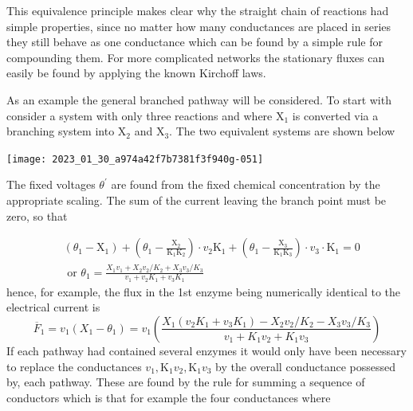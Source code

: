 This equivalence principle makes clear why the straight chain of reactions had simple properties, since no matter how many conductances are placed in series they still behave as one conductance which can be found by a simple rule for compounding them. For more complicated networks the stationary fluxes can easily be found by applying the known Kirchoff laws.

As an example the general branched pathway will be considered. To start with consider a system with only three reactions and where $\mathrm{X}_{1}$ is converted via a branching system into $\mathrm{X}_{2}$ and $\mathrm{X}_{3}$. The two equivalent systems are shown below


\begin{center}
\texttt{[image: 2023\_01\_30\_a974a42f7b7381f3f940g-051]}
\end{center}


The fixed voltages $\theta^{\prime}$ are found from the fixed chemical concentration by the appropriate scaling. The sum of the current leaving the branch point must be zero, so that

$$
\begin{aligned}
& \left(\theta_{1}-\mathrm{X}_{1}\right)+\left(\theta_{1}-\frac{\mathrm{X}_{2}}{\mathrm{K}_{1} \mathrm{K}_{2}}\right) \cdot v_{2} \mathrm{K}_{1} + \left(\theta_{1}-\frac{\mathrm{X}_{3}}{\mathrm{K}_{1} \mathrm{K}_{3}}\right) \cdot v_{3} \cdot \mathrm{K}_{1} = 0 \\[5pt]
& \text { or } \theta_{1} = \frac{X_{1} v_{1} + X_{2} v_{2} \bigg/ K_{2} + X_{3} v_{3} \bigg/ K_{3}}{v_{1} + v_{2} K_{1} + v_{3} K_{1}}
\end{aligned}
$$
%
hence, for example, the flux in the 1st enzyme being numerically identical to the electrical current is
%
$$
\overline{F}_{1}=v_{1}\left(X_{1}-\theta_{1}\right) = v_{1}\left(\frac{X_{1}\left(v_{2} K_{1}+v_{3} K_{1}\right)-X_{2} v_{2} \bigg/ K_{2}-X_{3} v_{3} \bigg/ K_{3}}{v_{1}+K_{1} v_{2}+K_{1} v_{3}} \right)
$$
%
If each pathway had contained several enzymes it would only have been necessary to replace the conductances $v_{1}, \mathrm{K}_{1} v_{2}, \mathrm{K}_{1} v_{3}$ by the overall conductance possessed by, each pathway. These are found by the rule for summing a sequence of conductors which is that for example the four conductances where

